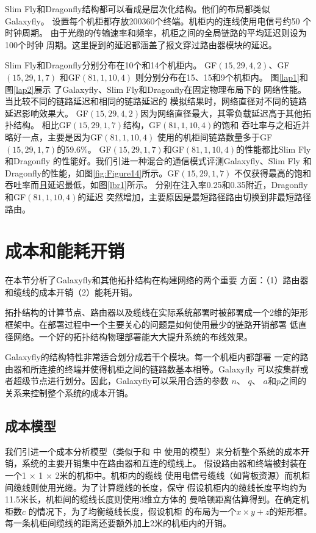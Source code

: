 Slim Fly和Dragonfly结构都可以看成是层次化结构。他们的布局都类似Galaxyfly。
设置每个机柜都存放200\-360个终端。机柜内的连线使用电信号约50 个时钟周期。
由于光缆的传输速率和频率，机柜之间的全局链路的平均延迟则设为100个时钟
周期。这里提到的延迟都涵盖了报文穿过路由器模块的延迟。

Slim Fly和Dragonfly分别分布在10个和14个机柜内。
GF$(15,29,4,2)$、GF$(15,29,1,7)$ 和GF$(81,1,10,4)$
则分别分布在15、15和9个机柜内。
图\ref{lap1}和图\ref{lap2}展示
了Galaxyfly、Slim Fly和Dragonfly在固定物理布局下的
网络性能。当比较不同的链路延迟和相同的链路延迟的
模拟结果时，网络直径对不同的链路延迟影响效果大。
GF$(15,29,4,2)$因为网络直径最大，其零负载延迟高于其他拓扑结构。
相比GF$(15,29,1,7)$结构，GF$(81,1,10,4)$的饱和
吞吐率与之相近并略好一点，主要是因为GF$(81,1,10,4)$
使用的机柜间链路数量多于GF$(15,29,1,7)$的59.6\%。
GF$(15,29,1,7)$和GF$(81,1,10,4)$的性能都比Slim Fly和Dragonfly
的性能好。我们引进一种混合的通信模式评测Galaxyfly、Slim Fly 和
Dragonfly的性能，如图\ref{fig:Figure14}所示。GF$(15,29,1,7)$
不仅获得最高的饱和吞吐率而且延迟最低，如图\ref{lbr1}所示。
分别在注入率0.25和0.35附近，Dragonfly和GF$(81,1,10,4)$的延迟
突然增加，主要原因是最短路径路由切换到非最短路径路由。


\section{成本和能耗开销}
在本节分析了Galaxyfly和其他拓扑结构在构建网络的两个重要
方面：（1）路由器和缆线的成本开销（2）能耗开销。

拓扑结构的计算节点、路由器以及缆线在实际系统部署时被部署成一个2维的矩形
框架中。在部署过程中一个主要关心的问题是如何使用最少的链路开销部署
低直径网络。一个好的拓扑结构物理部署能大大提升系统的布线效果。

Galaxyfly的结构特性非常适合划分成若干个模块。每一个机柜内都部署
一定的路由器和所连接的终端并使得机柜之间的链路数基本相等。Galaxyfly
可以按集群或者超级节点进行划分。因此，Galaxyfly可以采用合适的参数
$n$、 $q$、 $a$和$p$之间的关系来控制整个系统的成本开销。

\subsection{成本模型}

我们引进一个成本分析模型（类似于和 中
使用的模型）来分析整个系统的成本开销，系统的主要开销集中在路由器和互连的缆线上。
假设路由器和终端被封装在一个1 $\times$ 1 $\times$ 2米的机柜中。机柜内的缆线
使用电信号缆线（如背板资源）而机柜间缆线则使用光缆。为了计算缆线的长度，保守
假设机柜内的缆线长度平均约为1\-1.5米长，机柜间的缆线长度则使用3维立方体的
曼哈顿距离估算得到。在确定机柜数$c$ 的情况下，为了均衡缆线长度，假设机柜
的布局为一个$x\times y+z$的矩形框。每一条机柜间缆线的距离还要额外加上2米的机柜内的开销。

